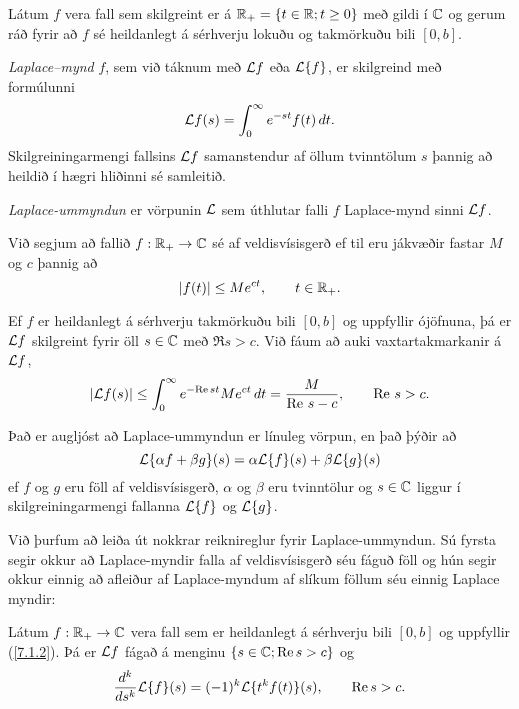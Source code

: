 \noindent
Látum $f$ vera fall sem skilgreint er á 
${\mathbb R}_+={\{t\in {\mathbb R}; t\geq 0\}}$ með gildi í ${\mathbb C}$ og gerum ráð fyrir að
$f$ sé heildanlegt á sérhverju lokuðu og takmörkuðu bili $[0,b]$.


{\it Laplace--mynd} $f$, 
sem við táknum með ${\cal L} f$ eða ${\cal L}{\{f\}}$, er skilgreind með
formúlunni
 \begin{equation*}{\cal L} f(s)=\int_0\sp \infty e\sp{-st}f(t)\, dt.\label{7.1.1}
 \end{equation*}
Skilgreiningarmengi fallsins ${\cal L} f$ samanstendur af öllum
tvinntölum $s$ þannig að heildið í hægri hliðinni sé samleitið.  


{\it Laplace-ummyndun} er vörpunin ${\cal L}$ sem úthlutar falli $f$ 
Laplace-mynd sinni ${\cal L} f$.


\begin{sk}\label{skil10.1.1a}
Við segjum að fallið $f:{\mathbb R}_+\to {\mathbb C}$ sé af
veldisvísisgerð ef til eru
jákvæðir fastar $M$ og $c$ þannig að 
 \begin{equation*}|f(t)|\leq Me\sp{c t}, \qquad t\in {\mathbb R}_+.\label{7.1.2}
 \end{equation*}
\end{sk}

Ef $f$ er heildanlegt á sérhverju takmörkuðu bili $[0,b]$ og uppfyllir 
ójöfnuna, þá er ${\cal L} f$ skilgreint fyrir öll $s\in {\mathbb C}$ með $\Re s
>c$.   Við fáum að auki
vaxtartakmarkanir á ${\cal L} f$,
 \begin{equation*}
|{\cal L} f(s) |\leq \int_0\sp\infty e\sp{-{\operatorname{Re\, }}st} Me\sp{c t} \, dt =
\dfrac M{{\operatorname{Re\, }}\,  s-c}, \qquad {\operatorname{Re\, }}\,  s>c.
\label{7.1.3}
 \end{equation*}


Það er augljóst að Laplace-ummyndun er línuleg vörpun, en það þýðir að
$$
{\cal L}\{\alpha f+\beta g\}(s)=\alpha{\cal L}\{f\}(s)+\beta{\cal L}\{g\}(s)
$$
ef $f$ og $g$ eru föll af veldisvísisgerð, $\alpha$ og $\beta$ eru
tvinntölur og $s\in {\mathbb C}$ liggur í skilgreiningarmengi fallanna
${\cal L}\{f\}$ og ${\cal L}\{g\}$.

\smallskip
Við þurfum að leiða út nokkrar reiknireglur fyrir Laplace-ummyndun.
Sú fyrsta segir okkur að Laplace-myndir falla af veldisvísisgerð séu
fáguð föll og hún segir okkur einnig að afleiður af Laplace-myndum 
af slíkum föllum  séu  einnig Laplace myndir: 


\begin{se} \label{se10.1.2a} Látum $f:{\mathbb R}_+\to {\mathbb C}$ vera fall sem er heildanlegt á
sérhverju bili $[0,b]$ og   uppfyllir (\ref{7.1.2}).  Þá er ${\cal L} f$ 
fágað á menginu ${\{s\in {\mathbb C};{\operatorname{Re\, }} s>c\}}$ og 
 \begin{equation*}\dfrac{d^k}{ds^k}{\cal L}{\{f\}}(s)=
(-1)^k{\cal L}{\{t^kf(t)\}}(s), \qquad {\operatorname{Re\, }} s>c.
\label{7.1.4}
 \end{equation*}
\end{se}

